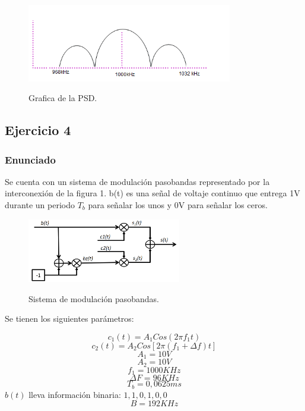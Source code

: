 \vspace{200px}
 \begin{figure}[h!]
	\captionsetup{justification = raggedright, singlelinecheck = false}
    \caption{Grafica de la PSD.}
    \centering
    \includegraphics[width=0.8\textwidth]{Imagenes/PSDD.png}
    \label{fig:graficaPSD}
\end{figure}
\subsection{Ejercicio 4}
\subsubsection{Enunciado}
Se cuenta con un sistema de modulaci\'on pasobandas representado por la interconexi\'on de la figura 1. b(t) es una se\~nal de voltaje continuo que entrega 1V durante un periodo $T_{b}$ para se\~nalar los unos y 0V para se\~nalar los ceros.\\



 \begin{figure}[h!]
	\captionsetup{justification = raggedright, singlelinecheck = false}
    \caption{Sistema de modulaci\'on pasobandas.}
    \centering
    \includegraphics[width=0.6\textwidth]{Imagenes/1.png}
    \label{fig:imagenuno}
\end{figure}

Se tienen los siguientes par\'ametros:\

\[ c_{1}(t)=A_{1}Cos(2\pi f_{1}t) \]
\[ c_{2}(t)=A_{2}Cos[2\pi(f_{1}+\Delta f)t] \]
\[A_{1}=10V \]
\[A_{2}=10V \]
\[f_{1}=1000KHz \]
\[\Delta F=96KHz  \]
\[T_{b}=0,0625ms  \]
$b(t)$ lleva informaci\'on binaria: $ 1,1,0,1,0,0  $
\[B=192KHz \]

